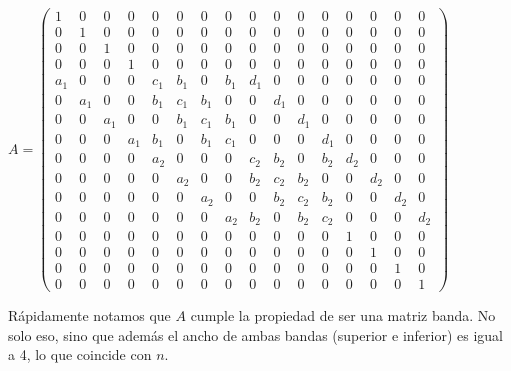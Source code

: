 \setcounter{MaxMatrixCols}{16}
\begin{center}
$ A =
\begin{pmatrix}
	1	 	& 0 		& 0 		& 	0	 	& 0	 	& 0 		& 0	 	& 	0 		& 0		& 0 		& 0 		& 	0	  & 0		& 0	 	& 0 		& 	0\\
	0	 	& 1 		& 0 		& 	0	 	& 0 		& 0		& 0	 	& 	0 		& 0 		& 0 		& 0 		& 	0	  & 0 		& 0	 	& 0 		& 	0\\
	0	 	& 0 		& 1 		& 	0	 	& 0 		& 0 		& 0	 	& 	0 		& 0 		& 0 		& 0 		& 	0	  & 0 		& 0	 	& 0 		& 	0\\
	0 		& 0 		& 0 		& 1	 	& 0 		& 0 		& 0	 	& 	0 		& 0 		& 0 		& 0 		& 	0	  & 0 		& 0	 	& 0 		& 	0\\
	a_1 & 0 		& 0		& 0	 	& c_1 	& b_1 & 0		& b_1 & d_1 	& 0 		& 0 		& 	0	  & 0 		& 0	 	& 0 		& 	0\\
	0 		& a_1	& 0		& 0	 	& b_1 	& c_1 & b_1 	& 0 		& 0 		& d_1 	& 0 		& 	0	  & 0 		& 0	 	& 0 		& 	0\\
	0 		& 	0		& a_1	& 0	 	& 0		& b_1 	& c_1 & b_1 	& 0 		& 0 		& d_1 	& 0 	  & 0		& 0 	 	& 0		& 0\\
	0	 	& 0 		& 0 		& a_1	& b_1	& 0 		& b_1 	& c_1	& 0		& 0 		& 0 		& d_1 & 0 		& 0	 	& 0 		& 	0\\
	0 		& 0	 	& 0 		& 	0		&	a_2 & 0 		& 0		& 0	 	& c_2 	& b_2 & 0		& b_2 & d_2 	& 0 		& 0 		& 	0\\
	0 		& 	0	  & 0 		& 0	 	& 0 		& a_2	& 0		& 0	 	& b_2 	& c_2 & b_2 	& 0 		& 0 		& d_2 	& 0		& 0\\
	0 		& 	0		& 0 	 	& 0		& 0		& 0 		& a_2	& 0	 	& 0		& b_2 	& c_2 & b_2 	& 0 		& 0 		& d_2 	& 0\\ 	 
	0	 	& 0 		& 0 		& 0 		& 0	 	& 0 		& 	0		& a_2	& b_2	& 0 		& b_2 	& c_2	& 0		& 0 		& 0 		& d_2\\
	0	 	& 0 		& 0 		& 	0	 	& 0	 	& 0 		& 0	 	& 	0 		& 0		& 0 		& 0 		& 	0	  & 1		& 0	 	& 0 		& 	0\\
	0	 	& 0 		& 0 		& 	0	 	& 0 		& 0		& 0	 	& 	0 		& 0 		& 0 		& 0 		& 	0	  & 0 		& 1	 	& 0 		& 	0\\
	0	 	& 0 		& 0 		& 	0	 	& 0 		& 0 		& 0	 	& 	0 		& 0 		& 0 		& 0 		& 	0	  & 0 		& 0	 	& 1 		& 	0\\
	0 		& 0 		& 0 		& 0	 	& 0 		& 0 		& 0	 	& 	0 		& 0 		& 0 		& 0 		& 	0	  & 0 		& 0	 	& 0 		& 	1
\end{pmatrix} 
$
\end{center}

Rápidamente notamos que $A$ cumple la propiedad de ser una matriz banda. No solo eso, sino que además el ancho de ambas bandas (superior e inferior) es igual a 4, lo que coincide con $n$.

